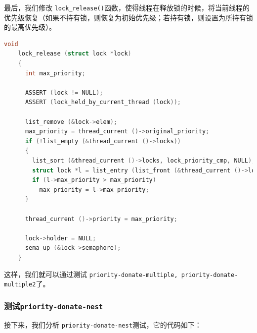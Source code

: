 \documentclass{article}
\begin{document}
最后，我们修改 \texttt{lock\_release()}函数，使得线程在释放锁的时候，将当前线程的优先级恢复（如果不持有锁，则恢复为初始优先级；若持有锁，则设置为所持有锁的最高优先级）。

\begin{lstlisting}[language=C, title=修改后的\texttt{lock\_release()}函数]
    void
    lock_release (struct lock *lock) 
    {
      int max_priority;
    
      ASSERT (lock != NULL);
      ASSERT (lock_held_by_current_thread (lock));
    
      list_remove (&lock->elem);
      max_priority = thread_current ()->original_priority;
      if (!list_empty (&thread_current ()->locks))
      {
        list_sort (&thread_current ()->locks, lock_priority_cmp, NULL);
        struct lock *l = list_entry (list_front (&thread_current ()->locks), struct lock, elem);
        if (l->max_priority > max_priority)
          max_priority = l->max_priority;
      }
    
      thread_current ()->priority = max_priority;
    
      lock->holder = NULL;
      sema_up (&lock->semaphore);
    }

\end{lstlisting}

这样，我们就可以通过测试 \texttt{priority-donate-multiple, priority-donate-multiple2}了。

\subsubsection{测试\texttt{priority-donate-nest}}

接下来，我们分析 \texttt{priority-donate-nest}测试，它的代码如下：
\end{document}
